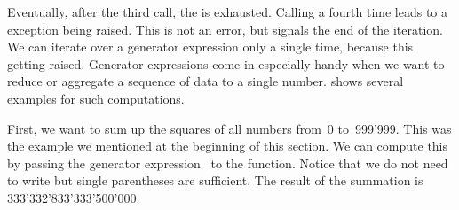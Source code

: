 Eventually, after the third  call, the  is exhausted.
Calling  a fourth time leads to a  exception being raised.
This is not an error, but signals the end of the iteration.
We can iterate over a generator expression only a single time, because this  getting raised.%
%
%
%
%
%
%
Generator expressions come in especially handy when we want to reduce or aggregate a sequence of data to a single number.
 shows several examples for such computations.

First, we want to sum up the squares of all numbers from~0 to~999'999.
This was the example we mentioned at the beginning of this section.
We can compute this by passing the generator expression~ to the  function.
Notice that we do not need to write  but single parentheses are sufficient.
The result of the summation is 333'332'833'333'500'000.

